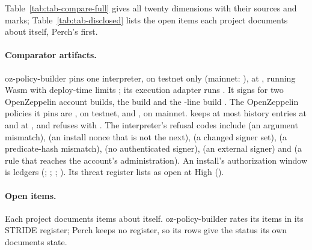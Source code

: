 Table~\ref{tab:tab-compare-full} gives all twenty dimensions with their sources
and marks; Table~\ref{tab:tab-disclosed} lists the open items each project
documents about itself, Perch's first.

\paragraph{Comparator artifacts.} oz-policy-builder pins one interpreter, on
testnet only (mainnet: ), at
, running Wasm 
with deploy-time limits ; its execution adapter runs
. It signs for two OpenZeppelin account builds, the
 build  and the
-line build . The OpenZeppelin
policies it pins are , on testnet, and
, on mainnet.  keeps at most
 history entries at  and
 at , and refuses with
. The interpreter's refusal codes include
 (an argument mismatch),
 (an install nonce that is not the next),
 (a changed signer set),
 (a predicate-hash mismatch),
 (no authenticated signer),
 (an external signer) and
 (a rule that reaches the account's
administration). An install's authorization window is
 ledgers (;
; ;
). Its threat register lists
 as open at High ().


\paragraph{Open items.} Each project documents items about itself.
oz-policy-builder rates its items in its STRIDE register; Perch keeps no register,
so its rows give the status its own documents state.

